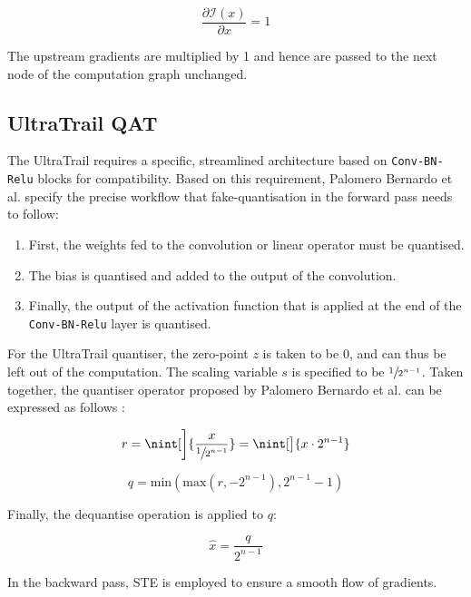 \documentclass[11pt,a4paper, open=any]{scrbook}
\DeclarePairedDelimiter{\nint}\lfloor\rceil
\begin{document}
\begin{equation}
	\frac{\partial{\mathcal{I}(x)}}
	{\partial{x}} = 1
\end{equation}

The upstream gradients are multiplied by 1 and hence are passed to the next node of the computation graph unchanged.

\subsection{UltraTrail QAT}\label{subsec:ut_qat}
The UltraTrail requires a specific, streamlined architecture based on \texttt{Conv-BN-Relu} blocks for compatibility. Based on this requirement, Palomero Bernardo et al. specify the precise workflow that fake-quantisation in the forward pass needs to follow:

\begin{enumerate}
	\item First, the weights fed to the convolution or linear operator must be quantised.
	\item The bias is quantised and added to the output of the convolution.
	\item Finally, the output of the activation function that is applied at the end of the \texttt{Conv-BN-Relu} layer is quantised.
\end{enumerate}

For the UltraTrail quantiser, the zero-point $z$ is taken to be 0, and can thus be left out of the computation. The scaling variable $s$ is specified to be $\sfrac{1}{2^{n-1}}$. Taken together, the quantiser operator proposed by Palomero Bernardo et al. can be expressed as follows \cite[3]{bernardo20}:

\begin{align*}
	r = \nint[\bigg]{\frac{x}{\sfrac{1}{2^{n-1}}}}
	= \nint[\big]{x \cdot 2^{n-1}}
\end{align*}

\begin{equation}
   q = \text{min}(\text{max}(r, -2^{n-1}), 2^{n-1}-1)
\end{equation}

Finally, the dequantise operation is applied to $q$:

\begin{equation}
	\hat{x} = \frac{q}{2^{n-1}}
\end{equation}

In the backward pass, STE is employed to ensure a smooth flow of gradients.
\end{document}
